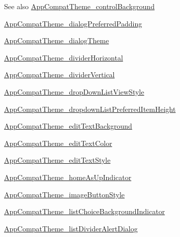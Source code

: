 \begin{DoxySeeAlso}{See also}
\hyperlink{classandroid_1_1support_1_1design_1_1R_1_1styleable_aea175cd3ba91e27d8d492e92dd519ac9}{App\+Compat\+Theme\+\_\+control\+Background} 

\hyperlink{classandroid_1_1support_1_1design_1_1R_1_1styleable_a404189687f7f202b9ed1a661ce3ac355}{App\+Compat\+Theme\+\_\+dialog\+Preferred\+Padding} 

\hyperlink{classandroid_1_1support_1_1design_1_1R_1_1styleable_af6160d10b114a6eb6ee2f89975605153}{App\+Compat\+Theme\+\_\+dialog\+Theme} 

\hyperlink{classandroid_1_1support_1_1design_1_1R_1_1styleable_a5366d4aaeb8ade180e8f192c8c58366f}{App\+Compat\+Theme\+\_\+divider\+Horizontal} 

\hyperlink{classandroid_1_1support_1_1design_1_1R_1_1styleable_a8a5a682e061f30c7bd82fc522c70f245}{App\+Compat\+Theme\+\_\+divider\+Vertical} 

\hyperlink{classandroid_1_1support_1_1design_1_1R_1_1styleable_aef3b0acbfc00c4f336874396809841c3}{App\+Compat\+Theme\+\_\+drop\+Down\+List\+View\+Style} 

\hyperlink{classandroid_1_1support_1_1design_1_1R_1_1styleable_a2bcc01dd4cd3ad74d4af832f4d79af52}{App\+Compat\+Theme\+\_\+dropdown\+List\+Preferred\+Item\+Height} 

\hyperlink{classandroid_1_1support_1_1design_1_1R_1_1styleable_a1ee151d494fb454277ff281e425c5556}{App\+Compat\+Theme\+\_\+edit\+Text\+Background} 

\hyperlink{classandroid_1_1support_1_1design_1_1R_1_1styleable_af735eb4a960975c07d0f92771af6d22c}{App\+Compat\+Theme\+\_\+edit\+Text\+Color} 

\hyperlink{classandroid_1_1support_1_1design_1_1R_1_1styleable_acc9842f5a15682537a17a07297b3d1fa}{App\+Compat\+Theme\+\_\+edit\+Text\+Style} 

\hyperlink{classandroid_1_1support_1_1design_1_1R_1_1styleable_a1b9f70963e0781f0c4c4e47161f8cb0f}{App\+Compat\+Theme\+\_\+home\+As\+Up\+Indicator} 

\hyperlink{classandroid_1_1support_1_1design_1_1R_1_1styleable_ac6d297b6830e11aed44a3f4f6ae32e54}{App\+Compat\+Theme\+\_\+image\+Button\+Style} 

\hyperlink{classandroid_1_1support_1_1design_1_1R_1_1styleable_a1818805fc2d169ac39a9c5c20b3cec4f}{App\+Compat\+Theme\+\_\+list\+Choice\+Background\+Indicator} 

\hyperlink{classandroid_1_1support_1_1design_1_1R_1_1styleable_a05b88d6115e3a28d5aa99a5d7c9aaace}{App\+Compat\+Theme\+\_\+list\+Divider\+Alert\+Dialog} 


\end{DoxySeeAlso}
